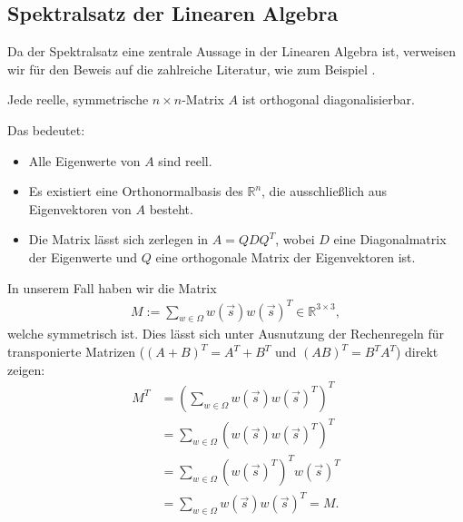 \subsection{Spektralsatz der Linearen Algebra} \label{sec:spektralsatzlinearealgebra}

Da der Spektralsatz eine zentrale Aussage in der Linearen Algebra ist, verweisen wir für den Beweis auf die zahlreiche Literatur, wie zum Beispiel \cite[Kap.~6.7]{fischer_lineare_algebra_20}. 

\begin{theorem} \label{thm:spektralsatzderlinearenalgebra}
Jede reelle, symmetrische $n \times n$-Matrix $A$ ist orthogonal diagonalisierbar.
\end{theorem}
Das bedeutet:
\begin{itemize}
    \item Alle Eigenwerte von $A$ sind reell.
    \item Es existiert eine Orthonormalbasis des $\mathbb{R}^n$, die ausschließlich aus Eigenvektoren von $A$ besteht.
    \item Die Matrix lässt sich zerlegen in $A = Q D Q^T$, wobei $D$ eine Diagonalmatrix der Eigenwerte und $Q$ eine orthogonale Matrix der Eigenvektoren ist.
\end{itemize}

In unserem Fall haben wir die Matrix 
\begin{align}
    M := \sum_{w \in \Omega} w(\vec{s}) w(\vec{s})^T \in \mathbb{R}^{3 \times 3}, \nonumber 
\end{align}
welche symmetrisch ist. Dies lässt sich unter Ausnutzung der Rechenregeln für transponierte Matrizen ($(A+B)^T = A^T + B^T$ und $(AB)^T = B^T A^T$) direkt zeigen:
\begin{align}
    M^T &= \left( \sum_{w \in \Omega} w(\vec{s}) w(\vec{s})^T \right)^T \nonumber \\
    &= \sum_{w \in \Omega} \left( w(\vec{s}) w(\vec{s})^T \right)^T \nonumber \\
    &= \sum_{w \in \Omega} (w(\vec{s})^T)^T w(\vec{s})^T \nonumber \\
    &= \sum_{w \in \Omega} w(\vec{s}) w(\vec{s})^T = M. \nonumber
\end{align}